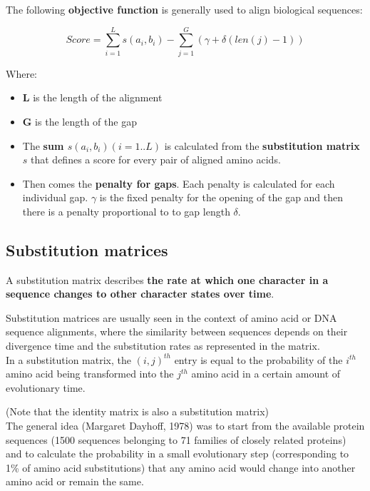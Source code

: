 The following \textbf{objective function} is generally used to align biological
sequences:

\begin{equation}
Score = \sum_{i=1}^{L} s(a_i,b_i) - \sum_{j=1}^{G} (\gamma + \delta(len(j)-1))
\end{equation}

Where:
\begin{itemize}
  \item \textbf{L} is the length of the alignment
  \item \textbf{G} is the length of the gap
  \item The \textbf{sum $s(a_i,b_i) (i=1..L) $} is calculated from the
\textbf{substitution matrix} $s$ that defines a score for every pair of aligned
amino acids.
  \item Then comes the \textbf{penalty for gaps}. Each penalty is calculated
 for each individual gap. \textbf{$\gamma$} is the fixed penalty for the
 opening of the gap and then there is a penalty proportional to to gap length
\textbf{$\delta$}.
\end{itemize}

\subsection{Substitution matrices}

A substitution matrix describes \textbf{the rate at which one character in a
sequence changes to other character states over time}.

Substitution matrices are usually seen in the context of amino acid or DNA
sequence alignments, where the similarity between sequences depends on their
divergence time and the substitution rates as represented in the matrix. \\

In a substitution matrix, the $(i,j)^{th}$ entry is equal to the probability of
the $i^{th}$ amino acid being transformed into the $j^{th}$ amino acid in a
certain amount of evolutionary time.

(Note that the identity matrix is also a substitution matrix) \\

The general idea (Margaret Dayhoff, 1978) was to start from the available
protein sequences (1500 sequences belonging to 71 families of closely related
proteins) and to calculate the probability in a small evolutionary step
(corresponding to 1\% of amino acid substitutions) that any amino acid would
change into another amino acid or remain the same.

